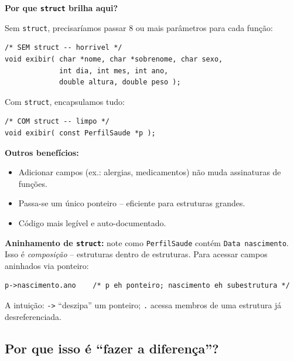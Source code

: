 \documentclass[12pt,a4paper]{article}
\begin{document}
\begin{boaprática}
\textbf{Por que \texttt{struct} brilha aqui?}

Sem \texttt{struct}, precisaríamos passar 8 ou mais parâmetros para cada função:
\begin{lstlisting}
/* SEM struct -- horrivel */
void exibir( char *nome, char *sobrenome, char sexo,
             int dia, int mes, int ano,
             double altura, double peso );
\end{lstlisting}

Com \texttt{struct}, encapsulamos tudo:
\begin{lstlisting}
/* COM struct -- limpo */
void exibir( const PerfilSaude *p );
\end{lstlisting}

\textbf{Outros benefícios:}
\begin{itemize}[noitemsep]
  \item Adicionar campos (ex.: alergias, medicamentos) não muda assinaturas de funções.
  \item Passa-se um único ponteiro -- eficiente para estruturas grandes.
  \item Código mais legível e auto-documentado.
\end{itemize}
\end{boaprática}

\bigskip

\begin{atencao}
\textbf{Aninhamento de \texttt{struct}:} note como \texttt{PerfilSaude} contém
\texttt{Data nascimento}. Isso é \textit{composição} -- estruturas dentro de
estruturas. Para acessar campos aninhados via ponteiro:
\begin{lstlisting}
p->nascimento.ano    /* p eh ponteiro; nascimento eh subestrutura */
\end{lstlisting}
A intuição: \texttt{->} ``deszipa'' um ponteiro; \texttt{.} acessa membros
de uma estrutura já desreferenciada.
\end{atencao}

\bigskip

\subsection*{Por que isso é ``fazer a diferença''?}
\end{document}

